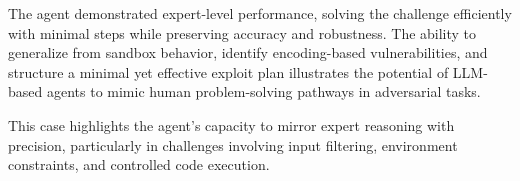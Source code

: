 
The agent demonstrated expert-level performance, solving the challenge efficiently with minimal steps while preserving accuracy and robustness. The ability to generalize from sandbox behavior, identify encoding-based vulnerabilities, and structure a minimal yet effective exploit plan illustrates the potential of LLM-based agents to mimic human problem-solving pathways in adversarial tasks.

This case highlights the agent's capacity to mirror expert reasoning with precision, particularly in challenges involving input filtering, environment constraints, and controlled code execution.


